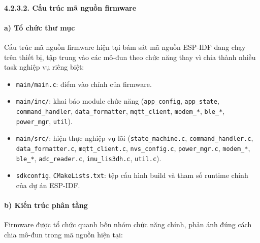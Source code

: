 \documentclass[a4paper]{extarticle}
\providecommand{\tightlist}{%
  \setlength{\itemsep}{0pt}\setlength{\parskip}{0pt}}
\begin{document}
\paragraph{4.2.3.2. Cấu trúc mã nguồn
firmware}\label{4232-cux1ea5u-truxfac-muxe3-nguux1ed3n-firmware}

\paragraph{a) Tổ chức thư
mục}\label{a-tux1ed5-chux1ee9c-thux1b0-mux1ee5c}

Cấu trúc mã nguồn firmware hiện tại bám sát mã nguồn ESP-IDF đang chạy
trên thiết bị, tập trung vào các mô-đun theo chức năng thay vì chia
thành nhiều task nghiệp vụ riêng biệt:

\begin{itemize}
\tightlist
\item
  \texttt{main/main.c}: điểm vào chính của firmware.
\item
  \texttt{main/inc/}: khai báo module chức năng
  (\texttt{app\_config}, \texttt{app\_state}, \texttt{command\_handler},
  \texttt{data\_formatter}, \texttt{mqtt\_client}, \texttt{modem\_*},
  \texttt{ble\_*}, \texttt{power\_mgr}, \texttt{util}).
\item
  \texttt{main/src/}: hiện thực nghiệp vụ lõi
  (\texttt{state\_machine.c}, \texttt{command\_handler.c},
  \texttt{data\_formatter.c}, \texttt{mqtt\_client.c},
  \texttt{nvs\_config.c}, \texttt{power\_mgr.c}, \texttt{modem\_*},
  \texttt{ble\_*}, \texttt{adc\_reader.c}, \texttt{imu\_lis3dh.c},
  \texttt{util.c}).
\item
  \texttt{sdkconfig}, \texttt{CMakeLists.txt}: tệp cấu hình build và tham
  số runtime chính của dự án ESP-IDF.
\end{itemize}

\paragraph{b) Kiến trúc phân
tầng}\label{b-kiux1ebfn-truxfac-phuxe2n-tux1ea7ng}

Firmware được tổ chức quanh bốn nhóm chức năng chính, phản ánh đúng cách
chia mô-đun trong mã nguồn hiện tại:
\end{document}

